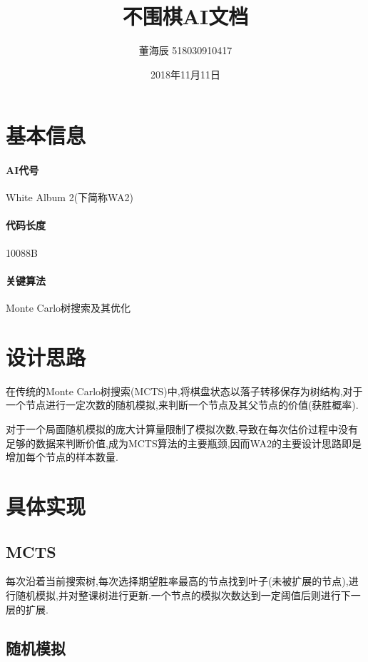 \documentclass[UTF8]{article}
\title{不围棋AI文档}
\author{董海辰 518030910417}
\date{2018年11月11日}
\theoremstyle{definition}
\begin{document}
\maketitle

\tableofcontents
\newpage

\section{基本信息}

\paragraph{AI代号} White Album 2(下简称WA2)

\paragraph{代码长度} 10088B

\paragraph{关键算法} Monte Carlo树搜索及其优化

\section{设计思路}

在传统的Monte Carlo树搜索(MCTS)中,将棋盘状态以落子转移保存为树结构,对于一个节点进行一定次数的随机模拟,来判断一个节点及其父节点的价值(获胜概率).

对于一个局面随机模拟的庞大计算量限制了模拟次数,导致在每次估价过程中没有足够的数据来判断价值,成为MCTS算法的主要瓶颈,因而WA2的主要设计思路即是增加每个节点的样本数量.

\section{具体实现}

\subsection{MCTS}

每次沿着当前搜索树,每次选择期望胜率最高的节点找到叶子(未被扩展的节点),进行随机模拟,并对整课树进行更新.一个节点的模拟次数达到一定阈值后则进行下一层的扩展.

\subsection{随机模拟}
\end{document}
